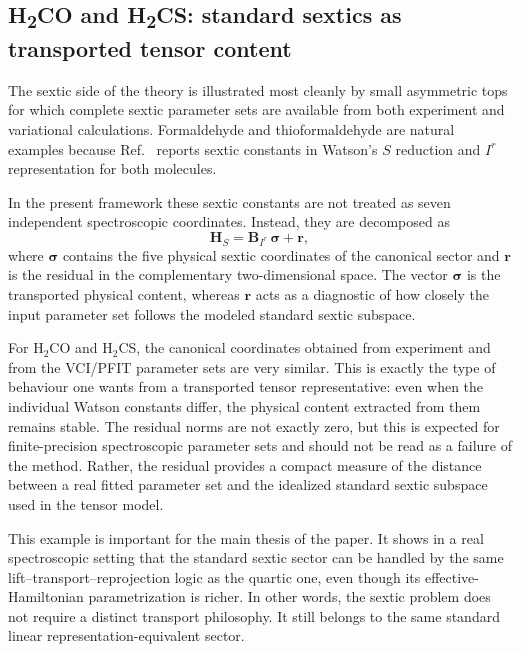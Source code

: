 \documentclass[journal=jacsat,manuscript=article]{achemso}
\begin{document}
\subsection{H\textsubscript{2}CO and H\textsubscript{2}CS: standard sextics as transported tensor content}

The sextic side of the theory is illustrated most cleanly by small asymmetric
tops for which complete sextic parameter sets are available from both
experiment and variational calculations. Formaldehyde and thioformaldehyde are
natural examples because Ref.~ reports sextic constants in
Watson's $S$ reduction and $I^r$ representation for both molecules.

In the present framework these sextic constants are not treated as seven
independent spectroscopic coordinates. Instead, they are decomposed as
\begin{equation}
\mathbf H_S = \mathbf B_{I^r}\,\boldsymbol\sigma + \mathbf r,
\end{equation}
where $\boldsymbol\sigma$ contains the five physical sextic coordinates of the
canonical sector and $\mathbf r$ is the residual in the complementary
two-dimensional space. The vector $\boldsymbol\sigma$ is the transported
physical content, whereas $\mathbf r$ acts as a diagnostic of how closely the
input parameter set follows the modeled standard sextic subspace.

For H$_2$CO and H$_2$CS, the canonical coordinates obtained from experiment and
from the VCI/PFIT parameter sets are very similar. This is exactly the type of
behaviour one wants from a transported tensor representative: even when the
individual Watson constants differ, the physical content extracted from them
remains stable. The residual norms are not exactly zero, but this is expected
for finite-precision spectroscopic parameter sets and should not be read as a
failure of the method. Rather, the residual provides a compact measure of the
distance between a real fitted parameter set and the idealized standard sextic
subspace used in the tensor model.

This example is important for the main thesis of the paper. It shows in a real
spectroscopic setting that the standard sextic sector can be handled by the
same lift--transport--reprojection logic as the quartic one, even though its
effective-Hamiltonian parametrization is richer. In other words, the sextic
problem does not require a distinct transport philosophy. It still belongs to
the same standard linear representation-equivalent sector.
\end{document}

